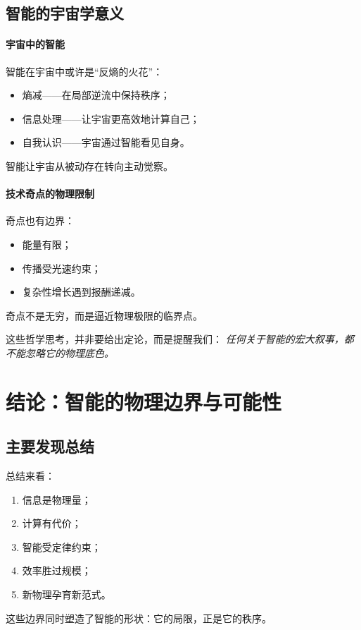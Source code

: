 \subsection{智能的宇宙学意义}

\paragraph{宇宙中的智能}
智能在宇宙中或许是“反熵的火花”：
\begin{itemize}
\item 熵减——在局部逆流中保持秩序；
\item 信息处理——让宇宙更高效地计算自己；
\item 自我认识——宇宙通过智能看见自身。
\end{itemize}
智能让宇宙从被动存在转向主动觉察。

\paragraph{技术奇点的物理限制}
奇点也有边界：
\begin{itemize}
\item 能量有限；
\item 传播受光速约束；
\item 复杂性增长遇到报酬递减。
\end{itemize}
奇点不是无穷，而是逼近物理极限的临界点。

这些哲学思考，并非要给出定论，而是提醒我们：  
\emph{任何关于智能的宏大叙事，都不能忽略它的物理底色。}

\section{结论：智能的物理边界与可能性}

\subsection{主要发现总结}

总结来看：
\begin{enumerate}
\item 信息是物理量；
\item 计算有代价；
\item 智能受定律约束；
\item 效率胜过规模；
\item 新物理孕育新范式。
\end{enumerate}
这些边界同时塑造了智能的形状：它的局限，正是它的秩序。

